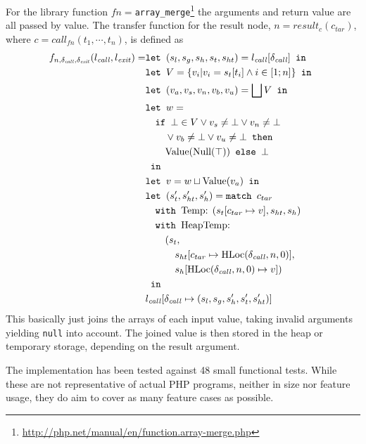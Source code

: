 For the library function $fn = $\texttt{array\_merge}\footnote{\url{http://php.net/manual/en/function.array-merge.php}} the arguments and return value are all passed by value. The transfer function for the result node, $n = \mathit{result}_{c}(c_{\mathit{tar}})$, where $c = \mathit{call}_{{fn}}(t_1,\cdots, t_n)$, is defined as 
\begin{align*}
f_{n,\delta_{\mathit{call}},\delta_{\mathit{exit}}}(l_{\mathit{call}}, l_{\mathit{exit}}) = 	&\texttt{let } (s_l, s_g, s_h, s_t, s_{ht}) = l_{\mathit{call}}[\delta_{\mathit{call}}] \texttt{ in }\notag\\
																							&\texttt{let } V =  \{v_i| v_i = s_t[t_i]\wedge i \in [1;n]\} \texttt{ in }\notag\\
																							&\texttt{let } (v_a,v_s, v_n, v_b, v_u) = \bigsqcup V \texttt{ in }\notag\\
																							&\texttt{let } w =  \notag\\
																							&\quad\texttt{if }\bot \in V \vee v_s \neq \bot \vee v_n \neq \bot\notag\\
																							&\quad\quad \vee v_b \neq \bot \vee v_u \neq \bot\texttt{ then } \notag\\
																							&\quad\quad\text{Value}(\text{Null}(\top)) \texttt{ else } \bot\notag\\
																							& \texttt{ in }\notag\\
																							&\texttt{let } v = w \sqcup \text{Value}(v_a) \texttt{ in }\notag\\
																							&\texttt{let } (s_t', s_{ht}',s_h') = \texttt{match }c_{tar}\notag\\
																							&\quad\texttt{with }\text{Temp}\text{: } (s_t[c_{tar}\mapsto v], s_{ht}, s_h)\notag\\
																							&\quad\texttt{with }\text{HeapTemp}\text{: }\notag\\
																							&\quad\quad(s_t, \notag\\
																							&\quad\quad\quad s_{ht}[c_{tar}\mapsto \text{HLoc}(\delta_{\mathit{call}}, n, 0)], \notag\\
																							&\quad\quad\quad s_h[\text{HLoc}(\delta_{\mathit{call}}, n, 0)\mapsto v])\notag\\
																							& \texttt{ in }\notag\\
																							&l_{\mathit{call}}[\delta_{\mathit{call}}\mapsto (s_l, s_g, s_h', s_t', s_{ht}')]
\end{align*} 
This basically just joins the arrays of each input value, taking invalid arguments yielding \texttt{null} into account. The joined value is then stored in the heap or temporary storage, depending on the result argument.

The implementation has been tested against 48 small functional tests. While these are not representative of actual PHP programs, neither in size nor feature usage, they do aim to cover as many feature cases as possible.

